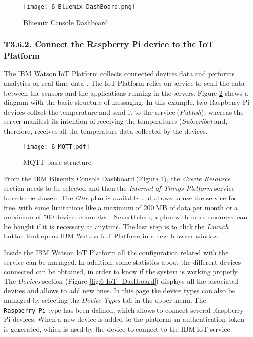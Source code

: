 \begin{figure}[!h]
	\begin{center}
		\texttt{[image: 6-Bluemix-DashBoard.png]}
		\caption{Bluemix Console Dashboard}
		\label{fig:6-Bluemix-DashBoard}
	\end{center}
\end{figure}


\subsubsection{T3.6.2. Connect the Raspberry Pi device to the IoT Platform}

The IBM Watson \ac{IoT} Platform collects connected devices data and performs analytics on real-time data \cite{IBMIoT}. The \ac{IoT} Platform relies on  service to send the data between the sensors and the applications running in the servers. Figure \ref{fig:6-MQTT} shows a diagram with the basic structure of  messaging. In this example, two Raspberry Pi devices collect the temperature and send it to the  service (\emph{Publish}), whereas the server manifest its intention of receiving the temperatures (\emph{Subscribe}) and, therefore, receives all the temperature data collected by the devices.

\begin{figure}[!h]
	\begin{center}
		\texttt{[image: 6-MQTT.pdf]}
		\caption{MQTT basic structure}
		\label{fig:6-MQTT}
	\end{center}
\end{figure}

From the IBM Bluemix Console Dashboard (Figure \ref{fig:6-Bluemix-DashBoard}), the \emph{Create Resource} section needs to be selected and then the \emph{Internet of Things Platform} service have to be chosen. The \emph{little} plan is available and allows to use the service for free, with some limitations like a maximum of 200 MB of data per month or a maximum of 500 devices connected. Nevertheless, a plan with more resources can be bought if it is necessary at anytime. The last step is to click the \textit{Launch} button that opens IBM Watson \ac{IoT} Platform in a new browser window.

Inside the IBM Watson \ac{IoT} Platform all the configuration related with the service can be managed. In addition, some statistics about the different devices connected can be obtained, in order to know if the system is working properly. The \textit{Devices} section (Figure \ref{fig:6-IoT_Dashboard}) displays all the associated devices and allows to add new ones. In this page the device types can also be managed by selecting the \textit{Device Types} tab in the upper menu. The \texttt{Raspberry\_Pi} type has been defined, which allows to connect several Raspberry Pi devices. When a new device is added to the platform an authentication token is generated, which is used by the device to connect to the IBM \ac{IoT} service. 

